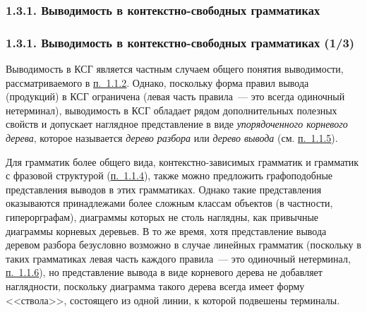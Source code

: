 \documentclass[mathserif,12pt,aspectratio=169]{beamer}
\def\emразделенной{\em разделенной}
\renewcommand{\index}[1]{}
\def\em#1{\it\color{blue}#1}
\def\odmkey#1#2{{\it\color{red} #1}\index{#2}}
\def\DMref#1#2{{\color{blue}\underline{\hyperlink{#2}{#1}}}}
\begin{document}
\subsubsection{1.3.1. Выводимость в контекстно-свободных грамматиках}\label{1.3.1.}
\begin{frame}
\frametitle{1.3.1. Выводимость в контекстно-свободных грамматиках (1/3)}

Выводимость в КСГ является частным случаем общего
понятия выводимости, рассматриваемого в \DMref{п.~1.1.2}{1.1.2.}. Однако, поскольку форма правил вывода (продукций)
в КСГ ограничена (левая часть правила~--- это всегда одиночный
нетерминал), выводимость в КСГ обладает 
рядом дополнительных полезных свойств и допускает наглядное 
представление в виде {\em упорядоченного корневого дерева},
которое называется  \odmkey{дерево разбора}{Дерево!разбора} или  \odmkey{дерево вывода}{Дерево!вывода} 
(см. \DMref{п.~1.1.5}{1.1.5.}).


\begin{remark}
Для грамматик более общего вида, контекстно-зависимых
грамматик и грамматик с фразовой структурой (\DMref{п.~1.1.4}{1.1.4.}), 
также можно предложить графоподобные представления
выводов в этих грамматиках.
Однако такие представления оказываются
принадлежами более сложным классам объектов
(в частности, гиперорграфам), 
диаграммы которых не столь наглядны, как привычные
диаграммы корневых деревьев.
В то же время, хотя представление вывода деревом разбора
безусловно возможно в случае линейных грамматик
(поскольку в таких грамматиках левая 
часть каждого правила~---  
это одиночный нетерминал, \DMref{п.~1.1.6}{1.1.6.}),
но представление вывода в виде корневого дерева
не добавляет наглядности, поскольку диаграмма 
такого дерева всегда имеет форму 
<<ствола>>, состоящего из одной линии, к которой
подвешены терминалы.  
\end{remark}

\end{frame}
\end{document}
